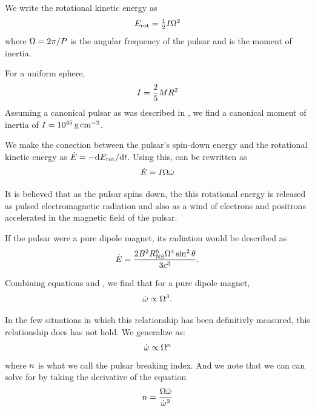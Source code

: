 We write the rotational kinetic energy as
\begin{equation}\eqnlabel{rotational_energy}
  \energyrotational = \tfrac{1}{2} I \PulsarAngularFrequency^2
\end{equation}
where $\Omega = 2\pi/P$ is
the angular frequency of the pulsar and
\momentofinertia is the moment of inertia.

For a uniform sphere,
\begin{equation}
  I = \frac{2}{5} M R^2
\end{equation}
Assuming a canonical pulsar as was described in ,
we find a canonical moment of inertia of 
$I=10^{45}\,\text{g}\,\text{cm}^{-2}$.

We make the conection between the pulsar's spin-down
energy and the rotational kinetic energy as $\dot{E} = -
\text{d}E_\text{rot}/\text{d}t$. Using this,
 can be rewritten as
\begin{equation}\eqnlabel{edot_from_rotation}
  \energydot = I \PulsarAngularFrequency \PulsarAngularFrequencyDot
\end{equation}

It is believed that as the pulsar spins down, the this rotational energy
is released as pulsed electromagnetic radiation and also as a wind of
electrons and positrons accelerated in the magnetic field of the pulsar.

If the pulsar were a pure dipole magnet, its radiation would be
described as \citep{gunn_1969_magnetic-dipole}
\begin{equation}\eqnlabel{edot_pure_dipole}
  \energydot = \frac{2\MagneticField^2 \PulsarRadius^6 
  \PulsarAngularFrequency^4 \sin^2\PulsarRotationAngle}{
  3\speedoflight^3}.
\end{equation}

Combining equations  and
, we find that for a pure dipole magnet,
\begin{equation}\eqnlabel{breaking_index_dipole}
\PulsarAngularFrequencyDot \propto \PulsarAngularFrequency^3.
\end{equation}

In the few situations in which this relationship has been
definitivly measured, this relationship does has not hold.
We generalize  as:
\begin{equation}\eqnlabel{angular_frequency_derivative_relation}
  \PulsarAngularFrequencyDot \propto \PulsarAngularFrequency^\breakingindex
\end{equation}
where $n$ is what we call the pulsar breaking index. 
And we note that 
we can can solve for \breakingindex by taking the derivative of the equation
\begin{equation}
  n = \frac{\Omega \ddot{\omega}}{\dot{\omega}^2}
\end{equation}

